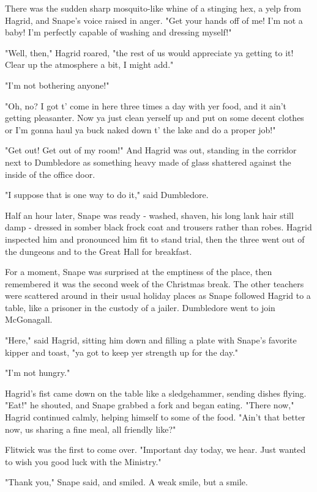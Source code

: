 There was the sudden sharp mosquito-like whine of a stinging hex, a yelp from Hagrid, and Snape's voice raised in anger. "Get your hands off of me! I'm not a baby! I'm perfectly capable of washing and dressing myself!"

"Well, then," Hagrid roared, "the rest of us would appreciate ya getting to it! Clear up the atmosphere a bit, I might add."

"I'm not bothering anyone!"

"Oh, no? I got t' come in here three times a day with yer food, and it ain't getting pleasanter. Now ya just clean yerself up and put on some decent clothes or I'm gonna haul ya buck naked down t' the lake and do a proper job!"

"Get out! Get out of my room!" And Hagrid was out, standing in the corridor next to Dumbledore as something heavy made of glass shattered against the inside of the office door.

"I suppose that is one way to do it," said Dumbledore.

Half an hour later, Snape was ready - washed, shaven, his long lank hair still damp - dressed in somber black frock coat and trousers rather than robes. Hagrid inspected him and pronounced him fit to stand trial, then the three went out of the dungeons and to the Great Hall for breakfast.

For a moment, Snape was surprised at the emptiness of the place, then remembered it was the second week of the Christmas break. The other teachers were scattered around in their usual holiday places as Snape followed Hagrid to a table, like a prisoner in the custody of a jailer. Dumbledore went to join McGonagall.

"Here," said Hagrid, sitting him down and filling a plate with Snape's favorite kipper and toast, "ya got to keep yer strength up for the day."

"I'm not hungry."

Hagrid's fist came down on the table like a sledgehammer, sending dishes flying. "Eat!" he shouted, and Snape grabbed a fork and began eating. "There now," Hagrid continued calmly, helping himself to some of the food. "Ain't that better now, us sharing a fine meal, all friendly like?"

Flitwick was the first to come over. "Important day today, we hear. Just wanted to wish you good luck with the Ministry."

"Thank you," Snape said, and smiled. A weak smile, but a smile.

